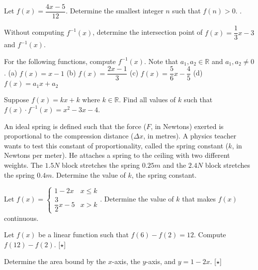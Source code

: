 \documentclass[../book.tex]{subfiles}
\begin{document}
\begin{reviewset}
\item Let $f(x)=\dfrac{4x-5}{12}$.  Determine the smallest integer $n$ such that $f(n)>0$.  \vspace{2mm}.

\item Without computing $f^{-1}(x)$, determine the intersection point of $f(x)=\dfrac{1}{3}x-3$ and $f^{-1}(x)$.  \vspace{3mm}

\item For the following functions, compute $f^{-1}(x)$.  Note that $a_1,a_2\in\mathbb{R}$ and $a_1,a_2\neq 0$.  \newline 
(a) $f(x)=x-1$ \hspace{50mm} (b) $f(x)=\dfrac{2x-1}{3}$\newline 
(c) $f(x)=\dfrac{5}{6}x-\dfrac{4}{5}$\hspace{47mm} (d) $f(x)=a_1x+a_2$ \vspace{3mm}

\item Suppose $f(x)=kx+k$ where $k\in\mathbb{R}$.  Find all values of $k$ such that $f(x)\cdot f^{-1}(x)=x^2-3x-4$.  \vspace{3mm}

\item An ideal spring is defined such that the force ($F$, in Newtons) exerted is proportional to the compression distance ($\Delta x$, in metres).  A physics teacher wants to test this constant of proportionality, called the spring constant ($k$, in Newtons per meter).  He attaches a spring to the ceiling with two different weights.  The $1.5N$ block stretches the spring $0.25m$ and the $2.4N$ block stretches the spring $0.4m$.  Determine the value of $k$, the spring constant.  \vspace{3mm}

\item Let $f(x)=\begin{cases} 1-2x & x \leq k \\ \dfrac{3}{2}x-5 & x > k \end{cases}$.  Determine the value of $k$ that makes $f(x)$ continuous.  \vspace{3mm}

\item Let $f(x)$ be a linear function such that $f(6)-f(2)=12$.  Compute $f(12)-f(2)$.  [$\star$] \vspace{1mm}

\item Determine the area bound by the $x$-axis, the $y$-axis, and $y=1-2x$.  [$\star$]
\end{reviewset}
\end{document}
